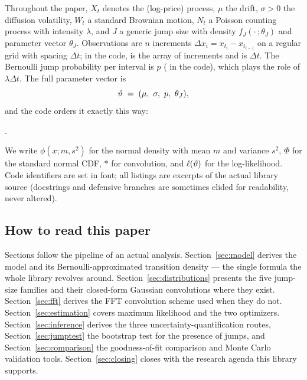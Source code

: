 Throughout the paper, $X_t$ denotes the (log-price) process, $\mu$ the
drift, $\sigma > 0$ the diffusion volatility, $W_t$ a standard Brownian
motion, $N_t$ a Poisson counting process with intensity $\lambda$, and
$J$ a generic jump size with density $f_J(\cdot\,;\theta_J)$ and parameter
vector $\theta_J$. Observations are $n$ increments
$\Delta x_i = x_{t_i} - x_{t_{i-1}}$ on a regular grid with spacing
$\Delta t$; in the code,  is the array of increments and
 is $\Delta t$. The Bernoulli jump probability per interval is
$p$ ( in the code), which plays the role of
$\lambda \Delta t$. The full parameter vector is
\[
  \vartheta \;=\; (\mu,\ \sigma,\ p,\ \theta_J),
\]
and the code orders it exactly this way:
\begin{center}
.
\end{center}
We write $\phi(x; m, s^2)$ for the normal density with mean $m$ and
variance $s^2$, $\Phi$ for the standard normal CDF, $*$ for convolution,
and $\ell(\vartheta)$ for the log-likelihood. Code identifiers are set
in  font; all listings are excerpts of the actual library
source (docstrings and defensive branches are sometimes elided for
readability, never altered).

\subsection{How to read this paper}

Sections follow the pipeline of an actual analysis.
Section~\ref{sec:model} derives the model and its Bernoulli-approximated
transition density --- the single formula the whole library revolves
around. Section~\ref{sec:distributions} presents the five jump-size
families and their closed-form Gaussian convolutions where they exist.
Section~\ref{sec:fft} derives the FFT convolution scheme used when they
do not. Section~\ref{sec:estimation} covers maximum likelihood and the
two optimizers. Section~\ref{sec:inference} derives the three
uncertainty-quantification routes, Section~\ref{sec:jumptest} the
bootstrap test for the presence of jumps, and Section~\ref{sec:comparison}
the goodness-of-fit comparison and Monte Carlo validation tools.
Section~\ref{sec:closing} closes with the research agenda this library
supports.
